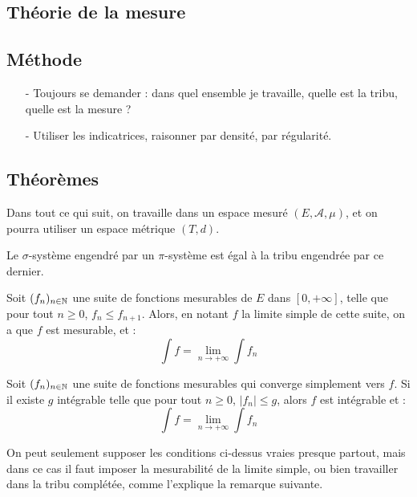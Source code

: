 \documentclass[11pt,a4paper]{article}
\begin{document}
\newpage
\begin{center}
\section{Théorie de la mesure} 
\end{center}


\subsection*{Méthode}

\begin{itemize}
\item[-] Toujours se demander : dans quel ensemble je travaille, quelle est la tribu, quelle est la mesure ? 
\item[-] Utiliser les indicatrices, raisonner par densité, par régularité.
\end{itemize}

\subsection*{Théorèmes}
Dans tout ce qui suit, on travaille dans un espace mesuré $(E,\mathcal{A},\mu)$, et on pourra utiliser un espace métrique $(T,d)$.


\begin{thm}[Dynkin] 
Le $\sigma$-système engendré par un $\pi$-système est égal à la tribu engendrée par ce dernier.
\end{thm}


\begin{thm}
Soit $(f_n)_{n\in\mathbb N}$ une suite de fonctions mesurables de $E$ dans $[0,+\infty]$, telle que pour tout $n\geq 0$, $f_n \leq f_{n+1}  $. Alors, en notant $f$ la limite simple de cette suite, on a que $f$ est mesurable, et : 
\[\int f = \lim\limits_{n \to +\infty} \int f_n \]
\end{thm}


\begin{thm}
Soit $(f_n)_{n\in\mathbb N}$ une suite de fonctions mesurables qui converge simplement vers $f$. Si il existe $g$ intégrable telle que pour tout $n \geq 0$, $\left| f_n \right| \leq g$, alors $f$ est intégrable et :
\[\int f = \lim\limits_{n \to +\infty} \int f_n \]
\end{thm}


\begin{rmq}
On peut seulement supposer les conditions ci-dessus vraies presque partout, mais dans ce cas il faut imposer la mesurabilité de la limite simple, ou bien travailler dans la tribu complétée, comme l'explique la remarque suivante.
\end{rmq}
\end{document}
